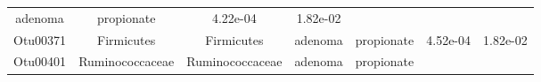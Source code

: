 \documentclass[11pt,]{article}
\begin{document}
\begin{longtable}[]{@{}ccccccc@{}}
\begin{minipage}[t]{0.09\columnwidth}
adenoma\strut
\end{minipage} & \begin{minipage}[t]{0.11\columnwidth}\centering\strut
propionate\strut
\end{minipage} & \begin{minipage}[t]{0.09\columnwidth}\centering\strut
4.22e-04\strut
\end{minipage} & \begin{minipage}[t]{0.09\columnwidth}\centering\strut
1.82e-02\strut
\end{minipage}\tabularnewline
\begin{minipage}[t]{0.09\columnwidth}\centering\strut
Otu00371\strut
\end{minipage} & \begin{minipage}[t]{0.17\columnwidth}\centering\strut
Firmicutes\strut
\end{minipage} & \begin{minipage}[t]{0.17\columnwidth}\centering\strut
Firmicutes\strut
\end{minipage} & \begin{minipage}[t]{0.09\columnwidth}\centering\strut
adenoma\strut
\end{minipage} & \begin{minipage}[t]{0.11\columnwidth}\centering\strut
propionate\strut
\end{minipage} & \begin{minipage}[t]{0.09\columnwidth}\centering\strut
4.52e-04\strut
\end{minipage} & \begin{minipage}[t]{0.09\columnwidth}\centering\strut
1.82e-02\strut
\end{minipage}\tabularnewline
\begin{minipage}[t]{0.09\columnwidth}\centering\strut
Otu00401\strut
\end{minipage} & \begin{minipage}[t]{0.17\columnwidth}\centering\strut
Ruminococcaceae\strut
\end{minipage} & \begin{minipage}[t]{0.17\columnwidth}\centering\strut
Ruminococcaceae\strut
\end{minipage} & \begin{minipage}[t]{0.09\columnwidth}\centering\strut
adenoma\strut
\end{minipage} & \begin{minipage}[t]{0.11\columnwidth}\centering\strut
propionate\strut
\end{minipage} & \begin{minipage}[t]{0.09\columnwidth}\centering\strut

\end{minipage}
\end{longtable}
\end{document}
